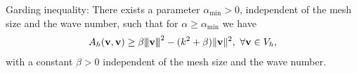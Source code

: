 \documentclass[final,leqno]{siamltex704}
\newcommand{\bn}{{\bf n}}
\newcommand{\bv}{{\bf v}}
\def\T{{\mathcal T}}
\def\F{{\mathcal F}}
\def\bn{{\bf n}}
\def\bu{{\bf u}}
\def\bv{{\bf v}}
\def\ljump{{[\![}}
\def\rjump{{]\!]}}
\def\lavg{{\{\!\{}}
\def\ravg{{\}\!\}}}
\newcommand{\pT}{{\partial T}}
\def\3bar{{|\hspace{-.02in}|\hspace{-.02in}|}}
\begin{document}

\begin{theorem}
Garding inequality: There exists a parameter $\alpha_{\min}>0$, independent of the mesh size and the wave number, such that for $\alpha\ge \alpha_{\min}$ we have
\begin{eqnarray}
A_h(\bv,\bv)\ge \beta\3bar \bv\3bar^2-(k^2+\beta)\|\bv\|^2,\ \forall \bv\in V_h,\label{eq:garding}
\end{eqnarray}
with a constant $\beta>0$ independent of the mesh size and the wave number.
\end{theorem}
\end{document}
